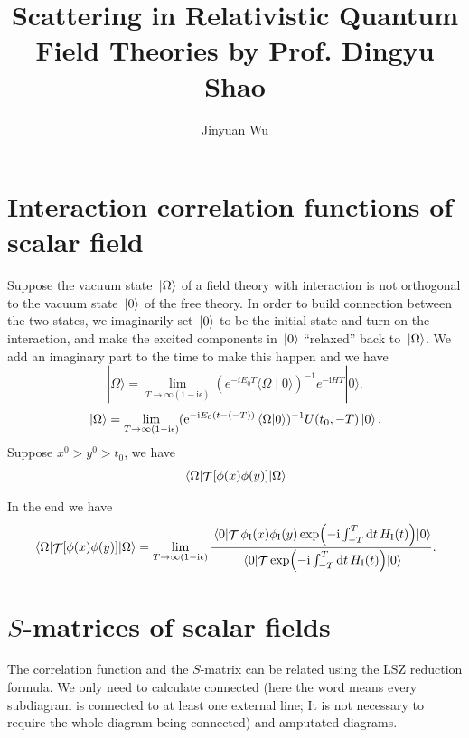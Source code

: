 \documentclass[hyperref, a4paper]{article}
\title{Scattering in Relativistic Quantum Field Theories by Prof. Dingyu Shao}
\author{Jinyuan Wu}
\DeclareMathOperator{\timeorder}{\mathcal{T}}
\newcommand*{\ii}{\mathrm{i}}
\newcommand*{\ee}{\mathrm{e}}
\begin{document}
\maketitle

\section{Interaction correlation functions of scalar field}

Suppose the vacuum state $\ket*{\Omega}$ of a field theory with interaction is not orthogonal to the vacuum state $\ket*{0}$ of the free theory.
In order to build connection between the two states, we imaginarily set $\ket*{0}$ to be the initial state and turn on the interaction, 
and make the excited components in $\ket*{0}$ ``relaxed'' back to $\ket*{\Omega}$.
We add an imaginary part to the time to make this happen and we have 
\[
    |\Omega\rangle=\lim _{T \rightarrow \infty(1-\ii \epsilon)}\left(e^{-i E_{0} T}\langle\Omega \mid 0\rangle\right)^{-1} e^{-\ii H T}|0\rangle.
\]
\begin{equation}
    \ket*{\Omega} = \lim_{T \to \infty(1 - \ii \epsilon)} (\ee^{- \ii E_0 (t - (-T))} \braket*{\Omega}{0})^{-1} U(t_0, -T) \ket*{0},
\end{equation}
Suppose $x^0 > y^0 > t_0$, we have 
\[
    \begin{aligned}
        \expval*{\timeorder[\phi(x) \phi(y)]}{\Omega} 
    \end{aligned}
\]

In the end we have
\begin{equation}
    \expval*{\timeorder[\phi(x) \phi(y)]}{\Omega} = \lim_{T \to \infty(1 - \ii \epsilon)} \frac{\expval*{\timeorder \phi_\text{I}(x) \phi_\text{I}(y) \exp (- \ii \int_{-T}^T \dd{t} H_\text{I}(t))}{0}}{\expval*{\timeorder \exp(- \ii \int_{-T}^T \dd{t} H_\text{I}(t))}{0}}.
\end{equation}

\section{$S$-matrices of scalar fields}

The correlation function and the $S$-matrix can be related using the LSZ reduction formula. 
We only need to calculate connected (here the word means every subdiagram is connected to at least one 
external line; It is not necessary to require the whole diagram being connected) and amputated diagrams.
\end{document}
